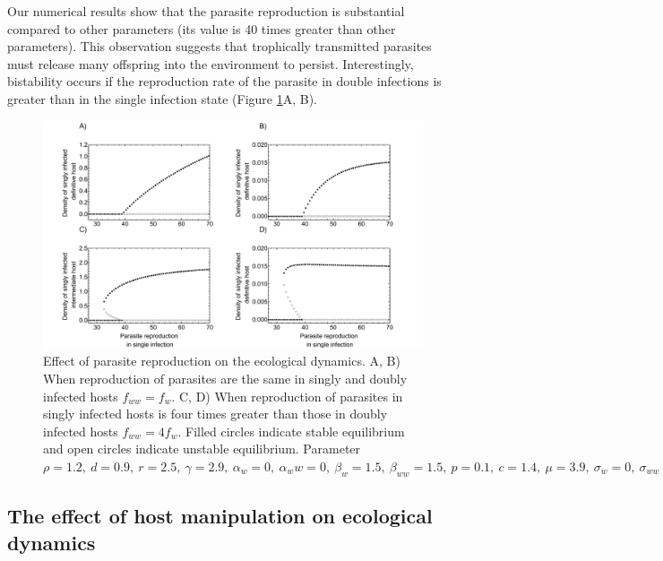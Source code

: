 \documentclass[11pt]{article}
\begin{document}
Our numerical results show that the parasite reproduction is substantial compared to other parameters (its value is 40 times greater than other parameters).
This observation suggests that trophically transmitted parasites must release many offspring into the environment to persist. 
Interestingly, bistability occurs if the reproduction rate of the parasite in double infections is greater than in the single infection state (Figure \ref{fig:bistability}A, B). 

\begin{figure}[!ht]
\includegraphics[width = \textwidth]{Figures/bistability.pdf}
\caption{Effect of parasite reproduction on the ecological dynamics. A, B) When reproduction of parasites are the same in singly and doubly infected hosts $f_{ww} = f_w$. C, D)  When reproduction of parasites in singly infected hosts is four times greater than those in doubly infected hosts $f_{ww} = 4 f_w$. Filled circles indicate stable equilibrium and open circles indicate unstable equilibrium. Parameter $\rho = 1.2, \  d = 0.9, \  r = 2.5, \ \gamma = 2.9, \ \alpha_w = 0, \ \alpha_ww =  0, \ \beta_w = 1.5, \ \beta_{ww} = 1.5, \ p = 0.1, \  c = 1.4, \ \mu = 3.9,  \ \sigma_w = 0, \ \sigma_{ww} = 0, \  q = 0.01, \ \delta = 0.9, \ k = 0.26$
}
\label{fig:bistability}
\end{figure}

\subsection*{The effect of host manipulation on ecological dynamics}
\end{document}
